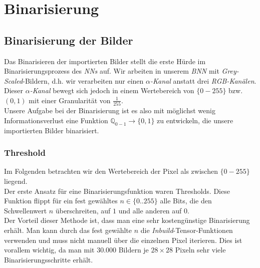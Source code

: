 \chapter{Binarisierung}
\section{Binarisierung der Bilder}
Das Binarisieren der importierten Bilder stellt die erste Hürde im Binarisierungsprozess des \textit{NNs} auf. Wir arbeiten in unserem \textit{BNN} mit \textit{Grey-Scaled}-Bildern, d.h. wir verarbeiten nur einen $\alpha$\textit{-Kanal} anstatt drei \textit{RGB-Kanälen}. Dieser $\alpha$\textit{-Kanal} bewegt sich jedoch in einem Wertebereich von $\{0-255\}$ bzw. $(0,1)$ mit einer Granularität von $\frac{1}{255}$.\\

Unsere Aufgabe bei der Binarisierung ist es also mit möglichst wenig Informationsverlust eine Funktion $\mathbb{Q}_{0-1} \rightarrow \{0,1\}$ zu entwickeln, die unsere importierten Bilder binarisiert.

\subsection{Threshold}

Im Folgenden betrachten wir den Wertebereich der Pixel als zwischen $\{0-255\}$ liegend.\\Der erste Ansatz für eine Binarisierungsfunktion waren Thresholds. Diese Funktion flippt für ein fest gewähltes $n \in \{0..255\}$ alle Bits, die den Schwellenwert $n$ überschreiten, auf $1$ und alle anderen auf $0$.\\

Der Vorteil dieser Methode ist, dass man eine sehr kostengünstige Binarisierung erhält. Man kann durch das fest gewählte $n$ die \textit{Inbuild}-Tensor-Funktionen verwenden und muss nicht manuell über die einzelnen Pixel iterieren. Dies ist vorallem wichtig, da man mit $30.000$ Bildern je $28 \times 28$ Pixeln sehr viele Binarisierungsschritte erhält.\\

